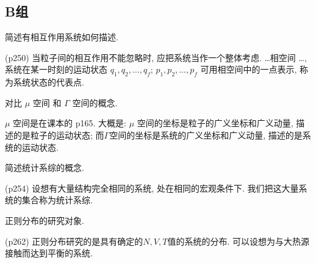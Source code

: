 \subsection{B组}
\begin{questions}
  \qt 简述有相互作用系统如何描述.
  \begin{solution}
    (p250) 当粒子间的相互作用不能忽略时, 应把系统当作一个整体考虑. \dots 相空间 \dots, 系统在某一时刻的运动状态 $q_1, q_2, \dots, q_f$; $p_1, p_2,\dots, p_f$ 可用相空间中的一点表示, 称为系统状态的代表点.
  \end{solution}
  \qt 对比 $\mu$ 空间 和 $\Gamma$ 空间的概念.
  \begin{solution}
    $\mu$ 空间是在课本的 p165. 大概是: $\mu$ 空间的坐标是粒子的广义坐标和广义动量, 描述的是粒子的运动状态; 而$\Gamma$空间的坐标是系统的广义坐标和广义动量, 描述的是系统的运动状态.
  \end{solution}
  \qt 简述统计系综的概念.
  \begin{solution}
    (p254) 设想有大量结构完全相同的系统, 处在相同的宏观条件下. 我们把这大量系统的集合称为统计系综.
  \end{solution}
  \qt 正则分布的研究对象.
  \begin{solution}
    (p262) 正则分布研究的是具有确定的$N,V,T$值的系统的分布. 可以设想为与大热源接触而达到平衡的系统.
  \end{solution}
\end{questions}